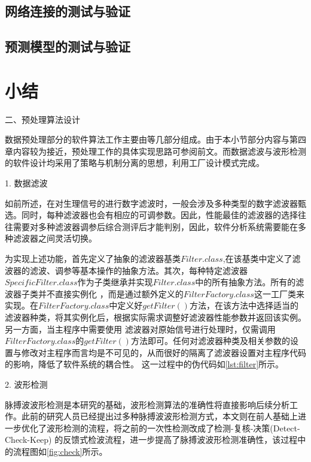 \subsection{网络连接的测试与验证}

\subsection{预测模型的测试与验证}

\section{小结}




二、预处理算法设计

数据预处理部分的软件算法工作主要由等几部分组成。由于本小节部分内容与第四章内容较为接近，预处理工作的具体实现思路可参阅前文。而数据滤波与波形检测的软件设计均采用了策略与机制分离的思想，利用工厂设计模式完成。

1. 数据滤波

如前所述，在对生理信号的进行数字滤波时，一般会涉及多种类型的数字滤波器甄选。同时，每种滤波器也会有相应的可调参数。因此，性能最佳的滤波器的选择往往需要对多种滤波器调参后综合测评后才能判别，因此，软件分析系统需要能在多种滤波器之间灵活切换。

为实现上述功能，首先定义了抽象的滤波器基类$Filter.class$,在该基类中定义了滤波器的滤波、调参等基本操作的抽象方法。其次，每种特定滤波器$SpecificFilter.class$作为子类继承并实现$Filter.class$中的所有抽象方法。所有的滤波器子类并不直接实例化
，而是通过额外定义的$FilterFactory.class$这一工厂类来实现。在$FilterFactory.class$中定义好$getFilter()$方法，在该方法中选择适当的滤波器种类，将其实例化后，根据实际需求调整好滤波器性能参数并返回该实例。另一方面，当主程序中需要使用
滤波器对原始信号进行处理时，仅需调用$FilterFactory.class$的$getFilter()$方法即可。任何对滤波器种类及相关参数的设置与修改对主程序而言均是不可见的，从而很好的隔离了滤波器设置对主程序代码的影响，降低了软件系统的耦合性。
这一过程中的伪代码如\autoref{lst:filter}所示。
% 

2. 波形检测

脉搏波波形检测是本研究的基础，波形检测算法的准确性将直接影响后续分析工作。此前的研究人员已经提出过多种脉搏波波形检测方式\cite{Wang2012}，本文则在前人基础上进一步优化了波形检测的流程，将之前的一次性检测改成了检测-复核-决策(Detect-Check-Keep)
的反馈式检波流程，进一步提高了脉搏波波形检测准确性，该过程中的流程图如\autoref{fig:check}所示。

